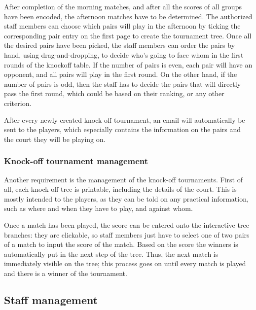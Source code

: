 After completion of the morning matches, and after all the scores of all groups
have been encoded, the afternoon matches have to be determined.
The authorized staff members can choose which pairs will play
in the afternoon by ticking the corresponding pair entry on the first page
to create the tournament tree. Once all the desired pairs have been picked,
the staff members can order the pairs by hand, using drag-and-dropping,
to decide who's going to face whom in the first rounds of the knockoff table.
If the number of pairs is even, each pair will have an opponent, and all pairs
will play in the first round. On the other hand, if the number of pairs is odd,
then the staff has to decide the pairs that will directly pass
the first round, which could be based on their ranking, or any other criterion.
\newline

After every newly created knock-off tournament, an email will automatically be
sent to the players, which especially contains the information on the pairs and
the court they will be playing on.

\subsubsection{Knock-off tournament management}
\label{subs:Knock-off tournament management}


Another requirement is the management of the knock-off tournaments. First of
all, each knock-off tree is printable, including the details of the court.
This is mostly intended to the players, as they can be told on any practical
information, such as where and when they have to play, and against whom.
\newline

Once a match has been played, the score can be entered onto the interactive
tree branches: they are clickable, so staff members just have to select one of
two pairs of a match to input the score of the match. Based on the score
the winners is automatically put in the next step of the tree. Thus, the next
match is immediately visible on the tree; this process goes on until every
match is played and there is a winner of the tournament.

\subsection{Staff management}
\label{sub:Staff management}

